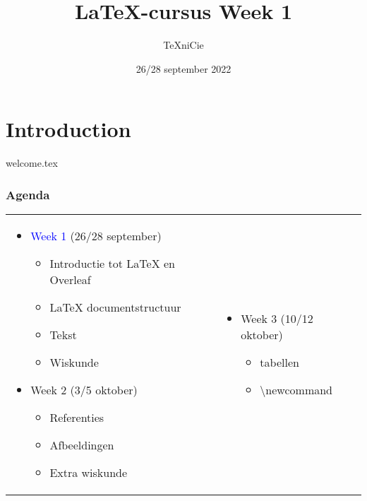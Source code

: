 \documentclass[allauthors,dutch]{../../cursuspresentatie}
\title{\LaTeX{}-cursus Week 1}
\author{\TeX niCie}
\date{26/28 september 2022}
\def\importslide#1#2{%
	{#2}
}
\begin{document}
\section{Introduction}
\importslide{beginners}{welcome.tex}

\begin{frame}
	\frametitle{Agenda}

	\begin{tabular}{p{6cm} p{7cm}}
	\begin{itemize}
		\item \textcolor{blue}{Week 1} (26/28 september)
	\begin{itemize}[label=\textbullet]
		\item Introductie tot LaTeX en Overleaf
		\item LaTeX documentstructuur
		\item Tekst
		\item Wiskunde
	\end{itemize}
		\item Week 2 (3/5 oktober)
	\begin{itemize}[label=\textbullet]
		\item Referenties
		\item Afbeeldingen
		\item Extra wiskunde
	\end{itemize}
	\end{itemize}
		&
	\begin{itemize}
		\item Week 3 (10/12 oktober)
			\begin{itemize}[label=\textbullet]
			\item tabellen
			\item \textbackslash newcommand

\end{itemize}
\end{itemize}
\end{tabular}
\end{frame}
\end{document}
